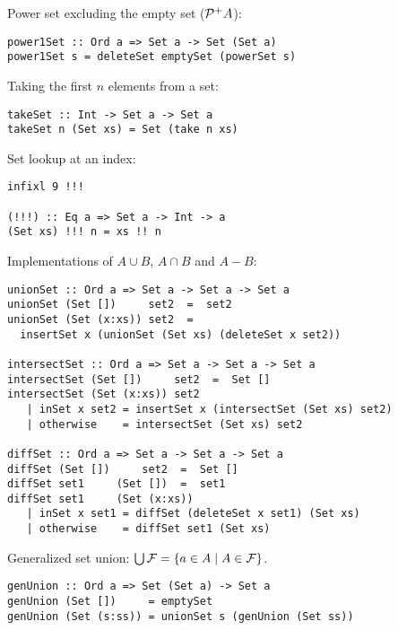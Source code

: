 Power set excluding the empty set (${\cal P}^+A$): 

\bc\begin{verbatim}
power1Set :: Ord a => Set a -> Set (Set a)
power1Set s = deleteSet emptySet (powerSet s) 
\end{verbatim}\ec

Taking the first $n$ elements from a set: 

\bc\begin{verbatim}
takeSet :: Int -> Set a -> Set a
takeSet n (Set xs) = Set (take n xs) 
\end{verbatim}\ec

Set lookup at an index: 

\bc\begin{verbatim}
infixl 9 !!!

(!!!) :: Eq a => Set a -> Int -> a 
(Set xs) !!! n = xs !! n
\end{verbatim}\ec

Implementations of $A \cup B$, $A \cap B$ and $A - B$: 

\bc\begin{verbatim}
unionSet :: Ord a => Set a -> Set a -> Set a
unionSet (Set [])     set2  =  set2
unionSet (Set (x:xs)) set2  =
  insertSet x (unionSet (Set xs) (deleteSet x set2))

intersectSet :: Ord a => Set a -> Set a -> Set a 
intersectSet (Set [])     set2  =  Set []
intersectSet (Set (x:xs)) set2 
   | inSet x set2 = insertSet x (intersectSet (Set xs) set2)
   | otherwise    = intersectSet (Set xs) set2

diffSet :: Ord a => Set a -> Set a -> Set a
diffSet (Set [])     set2  =  Set []
diffSet set1     (Set [])  =  set1
diffSet set1     (Set (x:xs)) 
   | inSet x set1 = diffSet (deleteSet x set1) (Set xs)
   | otherwise    = diffSet set1 (Set xs) 
\end{verbatim}\ec

Generalized set union: $\bigcup {\cal F} = \{ a \in A \mid A \in {\cal F} \}$. 

\bc\begin{verbatim}
genUnion :: Ord a => Set (Set a) -> Set a 
genUnion (Set [])     = emptySet
genUnion (Set (s:ss)) = unionSet s (genUnion (Set ss))
\end{verbatim}\ec
